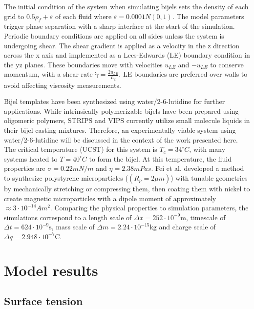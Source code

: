 The initial condition of the system when simulating bijels sets the density of each grid to $0.5\rho_f + \varepsilon$ of 
each fluid where $\varepsilon = 0.0001N(0,1)$. The model parameters trigger phase separation with a sharp interface at 
the start of the simulation. Periodic boundary conditions are applied on all sides unless the system is undergoing shear. 
The shear gradient is applied as a velocity in the z direction across the x axis and implemented as a Lees-Edwards 
(LE) boundary condition in the yz planes. \cite{wagner_leesedwards_2002, lorenz_lees-edwards_2009, yang_capillary_2022} 
These boundaries move with velocities $u_{LE}$ and $-u_{LE}$ to conserve momentum, with a shear rate 
$\dot{\gamma} = \frac{2 u_{LE}}{L_x}$. LE boundaries are preferred over walls to avoid affecting viscosity measurements. 
\cite{wagner_leesedwards_2002, lorenz_lees-edwards_2009, yang_capillary_2022}

Bijel templates have been synthesized using water/2-6-lutidine for further applications. \cite{lee_making_2013} 
While intrinsically polymerizable bijels have been prepared using oligomeric polymers, STRIPS and VIPS currently 
utilize small molecule liquids in their bijel casting mixtures. Therefore, an experimentally viable system using 
water/2-6-lutidine will be discussed in the context of the work presented here. The critical temperature (UCST) 
for this system is $T_c = 34 ^{\circ}C$, with many systems heated to $T = 40^{\circ}C$ to form the bijel. At this 
temperature, the fluid properties are $\sigma = 0.22 mN/m$ and $\eta = 2.38 mPas$. \cite{grattoni_lower_1993} 
Fei et al. developed a method to synthesize polystyrene microparticles ($(R_p = 2 \mu m)$) with tunable geometries 
by mechanically stretching or compressing them, then coating them with nickel to create magnetic microparticles with 
a dipole moment of approximately$\approx 3 \cdot 10^{-14} Am^2$. \cite{fei_active_2017, fei_magneto-capillary_2020} 
Comparing the physical properties to simulation parameters, the simulations correspond to a length scale of
$\Delta x = 252 \cdot 10^{-9} \text{m}$, timescale of $\Delta t = 624 \cdot 10^{-9} \text{s}$, 
mass scale of $\Delta m = 2.24 \cdot 10^{-15} \text{kg}$ and charge scale of $\Delta q = 2.948 \cdot 10^{-7} \text{C}$. 

\section{Model results}
\label{section:model_results}

\subsection{Surface tension}
\label{section:model_surface_tension}


